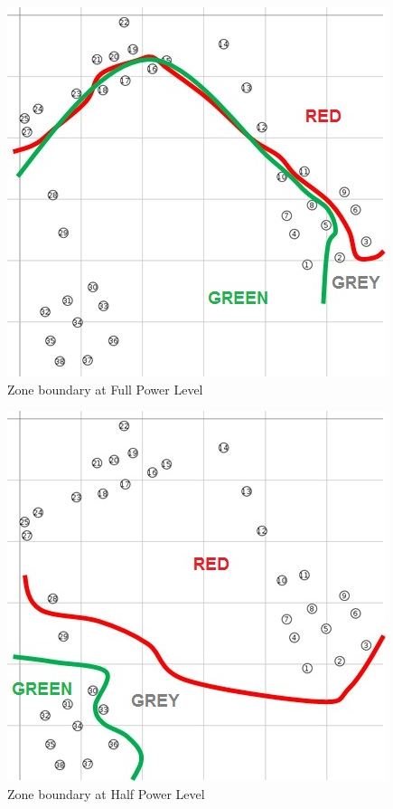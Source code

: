 \documentclass[conference]{IEEEtran}
\begin{document}
\begin{figure}[tbph!]
	\centering
        \includegraphics[width=.9\linewidth]{Owheo_full}
        \caption{Zone boundary at Full Power Level}
        \label{subfig:owheo_full}
\end{figure}

\begin{figure}[tbph!]
	\centering
        \includegraphics[width=.9\linewidth]{Owheo_half}
        \caption{Zone boundary at Half Power Level}
        \label{subfig:owheo_half}
\end{figure}
\end{document}
